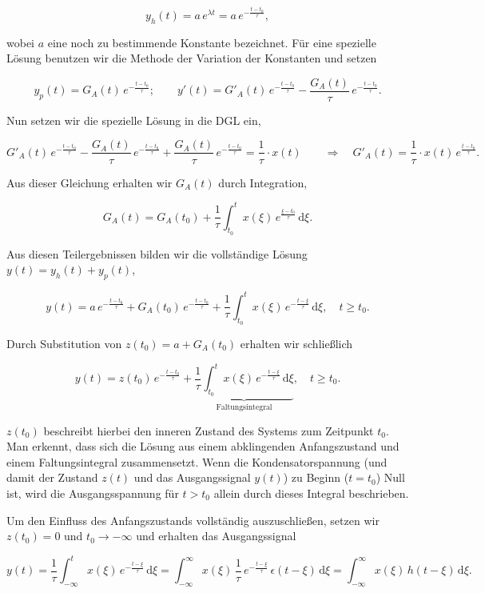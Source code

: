 \begin{beispiel}
$$
y_h(t) = a\,e^{\lambda t} = a\,e^{-\frac{t-t_0}{\tau}},
$$

wobei $a$ eine noch zu bestimmende Konstante bezeichnet. Für eine spezielle Lösung benutzen wir die Methode der Variation der Konstanten und setzen

$$
y_p(t) = G_A(t)\,e^{-\frac{t-t_0}{\tau}}; \qquad y'(t) = G'_A(t)\,e^{-\frac{t-t_0}{\tau}} - \frac{G_A(t)}{\tau}\,e^{-\frac{t-t_0}{\tau}}.
$$

Nun setzen wir die spezielle Lösung in die DGL ein,

$$
G'_A(t)\,e^{-\frac{t-t_0}{\tau}} - \frac{G_A(t)}{\tau}\,e^{-\frac{t-t_0}{\tau}} + \frac{G_A(t)}{\tau}\,e^{-\frac{t-t_0}{\tau}} = \frac{1}{\tau}\cdot x(t)
\qquad \Rightarrow\quad G'_A(t) = \frac{1}{\tau}\cdot x(t)\,e^{\frac{t-t_0}{\tau}}.
$$

Aus dieser Gleichung erhalten wir $G_A(t)$ durch Integration,

$$
G_A(t) = G_A(t_0) + \frac{1}{\tau}\int_{t_0}^{t} x(\xi)\,e^{\frac{\xi-t_0}{\tau}}\,\mathrm{d}\xi.
$$

Aus diesen Teilergebnissen bilden wir die vollständige Lösung $y(t) = y_h(t) + y_p(t)$,

$$
y(t) = a\,e^{-\frac{t-t_0}{\tau}} + G_A(t_0)\,e^{-\frac{t-t_0}{\tau}} + \frac{1}{\tau}\int_{t_0}^{t} x(\xi)\,e^{-\frac{t-\xi}{\tau}}\,\mathrm{d}\xi, \quad t \geq t_0.
$$

Durch Substitution von $z(t_0) = a + G_A(t_0)$ erhalten wir schließlich

$$
y(t) = z(t_0)\,e^{-\frac{t-t_0}{\tau}} + \underbrace{\frac{1}{\tau}\int_{t_0}^{t} x(\xi)\,e^{-\frac{t-\xi}{\tau}}\,\mathrm{d}\xi}_{\text{Faltungsintegral}}, \quad t \geq t_0.
$$

$z(t_0)$ beschreibt hierbei den inneren Zustand des Systems zum Zeitpunkt $t_0$. Man erkennt, dass sich die Lösung aus einem abklingenden Anfangszustand und einem Faltungsintegral zusammensetzt. Wenn die Kondensatorspannung (und damit der Zustand $z(t)$ und das Ausgangssignal $y(t)$) zu Beginn ($t = t_0$) Null ist, wird die Ausgangsspannung für $t > t_0$ allein durch dieses Integral beschrieben.

Um den Einfluss des Anfangszustands vollständig auszuschließen, setzen wir $z(t_0) = 0$ und $t_0 \to -\infty$ und erhalten das Ausgangssignal

$$
y(t) = \frac{1}{\tau}\int_{-\infty}^{t} x(\xi)\,e^{-\frac{t-\xi}{\tau}}\,\mathrm{d}\xi
= \int_{-\infty}^{\infty} x(\xi)\,\frac{1}{\tau}\,e^{-\frac{t-\xi}{\tau}}\,\epsilon(t-\xi)\,\mathrm{d}\xi
= \int_{-\infty}^{\infty} x(\xi)\,h(t-\xi)\,\mathrm{d}\xi.
$$


\end{beispiel}
